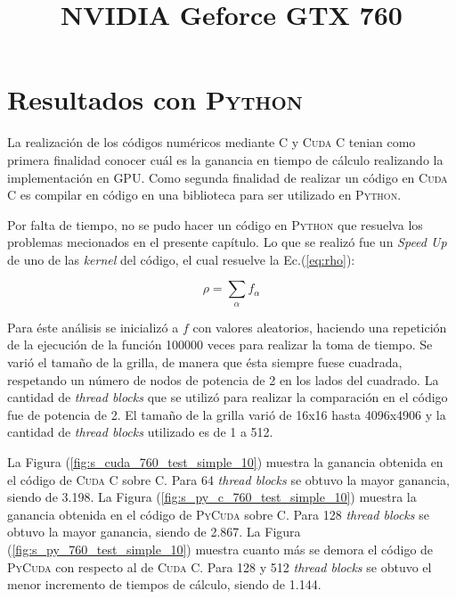 \fi

\section{Resultados con \textsc{Python}}

La realización de los códigos numéricos mediante \textsc{C} y \textsc{Cuda C} tenian como primera finalidad conocer cuál es la ganancia en tiempo de cálculo realizando la implementación en GPU. Como segunda finalidad de realizar un código en \textsc{Cuda C} es compilar en código en una biblioteca para ser utilizado en \textsc{Python}.

Por falta de tiempo, no se pudo hacer un código en \textsc{Python} que resuelva los problemas mecionados en el presente capítulo. Lo que se realizó fue un \textit{Speed Up} 
de uno de las \textit{kernel} del código, el cual resuelve la Ec.(\ref{eq:rho}):

\begin{equation*}
	\rho = \sum_{\alpha} f_{\alpha}
\end{equation*}

Para éste análisis se inicializó a $f$ con valores aleatorios, haciendo una repetición de la ejecución de la función 100000 veces para realizar la toma de tiempo. Se varió el tamaño de la grilla, de manera que ésta siempre fuese cuadrada, respetando un número de nodos de potencia de 2 en los lados del cuadrado. La cantidad de \textit{thread blocks} que se utilizó para realizar la comparación en el código fue de potencia de 2. El tamaño de la grilla varió de 16x16 hasta 4096x4906 y la cantidad de \textit{thread blocks} utilizado es de 1 a 512.

\newpage
\title{\textbf{NVIDIA Geforce GTX 760}}

La Figura (\ref{fig:s_cuda_760_test_simple_10}) muestra la ganancia obtenida en el código de \textsc{Cuda C} sobre \textsc{C}. Para 64 \textit{thread blocks} se obtuvo la mayor ganancia, siendo de 3.198. La Figura (\ref{fig:s_py_c_760_test_simple_10}) muestra la ganancia obtenida en el código de \textsc{PyCuda} sobre \textsc{C}. Para 128 \textit{thread blocks} se obtuvo la mayor ganancia, siendo de 2.867. La Figura (\ref{fig:s_py_760_test_simple_10}) muestra cuanto más se demora el código de \textsc{PyCuda} con respecto al de \textsc{Cuda C}. Para 128 y 512  \textit{thread blocks} se obtuvo el menor incremento de tiempos de cálculo, siendo de 1.144. 

